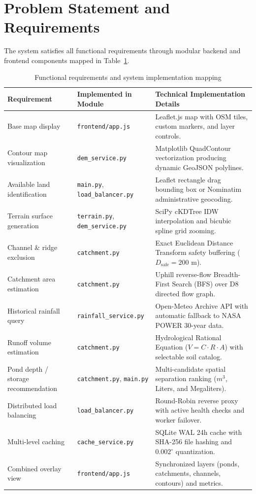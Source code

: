 \documentclass[manuscript,screen,review]{acmart}
\begin{document}
\section{Problem Statement and Requirements}
\label{sec:requirements}

The system satisfies all functional requirements through modular backend and frontend components mapped in Table~\ref{tab:requirements}.

\begin{table}[h]
  \caption{Functional requirements and system implementation mapping}
  \label{tab:requirements}
  \small
  \begin{tabular}{p{3.8cm}p{3.5cm}p{6.0cm}}
    \toprule
    Requirement & Implemented in Module & Technical Implementation Details \\
    \midrule
    Base map display & \texttt{frontend/app.js} & Leaflet.js map with OSM tiles, custom markers, and layer controls. \\
    Contour map visualization & \texttt{dem\_service.py} & Matplotlib QuadContour vectorization producing dynamic GeoJSON polylines. \\
    Available land identification & \texttt{main.py}, \texttt{load\_balancer.py} & Leaflet rectangle drag bounding box or Nominatim administrative geocoding. \\
    Terrain surface generation & \texttt{terrain.py}, \texttt{dem\_service.py} & SciPy cKDTree IDW interpolation and bicubic spline grid zooming. \\
    Channel \& ridge exclusion & \texttt{catchment.py} & Exact Euclidean Distance Transform safety buffering ($D_{\text{safe}} = 200\text{ m}$). \\
    Catchment area estimation & \texttt{catchment.py} & Uphill reverse-flow Breadth-First Search (BFS) over D8 directed flow graph. \\
    Historical rainfall query & \texttt{rainfall\_service.py} & Open-Meteo Archive API with automatic fallback to NASA POWER 30-year data. \\
    Runoff volume estimation & \texttt{catchment.py} & Hydrological Rational Equation ($V = C \cdot R \cdot A$) with selectable soil catalog. \\
    Pond depth / storage recommendation & \texttt{catchment.py}, \texttt{main.py} & Multi-candidate spatial separation ranking ($m^3$, Liters, and Megaliters). \\
    Distributed load balancing & \texttt{load\_balancer.py} & Round-Robin reverse proxy with active health checks and worker failover. \\
    Multi-level caching & \texttt{cache\_service.py} & SQLite WAL 24h cache with SHA-256 file hashing and $0.002^\circ$ quantization. \\
    Combined overlay view & \texttt{frontend/app.js} & Synchronized layers (ponds, catchments, channels, contours) and metrics. \\
    \bottomrule
  \end{tabular}
\end{table}
\end{document}
